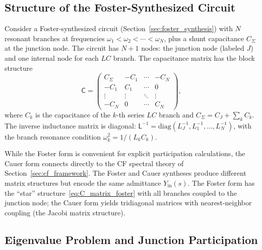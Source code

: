\documentclass[reprint, floatfix, superscriptaddress, amsmath, amssymb, longbibliography]{revtex4-2}
\newcommand{\Yin}{Y_{\mathrm{in}}}
\begin{document}
\subsection{Structure of the Foster-Synthesized Circuit}
\label{sec:foster_structure}

Consider a Foster-synthesized circuit (Section~\ref{sec:foster_synthesis}) with $N$ resonant branches at frequencies $\omega_1 < \omega_2 < \cdots < \omega_N$, plus a shunt capacitance $C_\Sigma$ at the junction node. The circuit has $N+1$ nodes: the junction node (labeled $J$) and one internal node for each $LC$ branch. The capacitance matrix has the block structure
\begin{equation}
\mathsf{C} = \begin{pmatrix}
C_\Sigma & -C_1 & \cdots & -C_N \\
-C_1 & C_1 & \cdots & 0 \\
\vdots & \vdots & \ddots & \vdots \\
-C_N & 0 & \cdots & C_N
\end{pmatrix},
\label{eq:C_matrix_foster}
\end{equation}
where $C_k$ is the capacitance of the $k$-th series $LC$ branch and $C_\Sigma = C_J + \sum_k C_k$. The inverse inductance matrix is diagonal: $\mathsf{L}^{-1} = \mathrm{diag}(L_J^{-1}, L_1^{-1}, \ldots, L_N^{-1})$, with the branch resonance condition $\omega_k^2 = 1/(L_k C_k)$.

While the Foster form is convenient for explicit participation calculations, the Cauer form connects directly to the CF spectral theory of Section~\ref{sec:cf_framework}. The Foster and Cauer syntheses produce different matrix structures but encode the same admittance $\Yin(s)$. The Foster form has the ``star'' structure~\eqref{eq:C_matrix_foster} with all branches coupled to the junction node; the Cauer form yields tridiagonal matrices with nearest-neighbor coupling (the Jacobi matrix structure).

\subsection{Eigenvalue Problem and Junction Participation}
\label{sec:gep_analysis}
\end{document}

